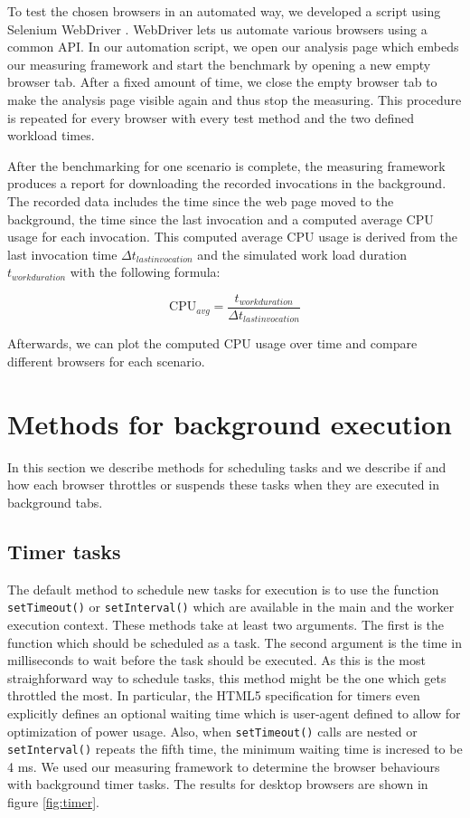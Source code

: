 \documentclass[
	ruledheaders=section,%
	class=report,%
	thesis={type=bachelor},%
	accentcolor=9c,%
	custommargins=true,%
	marginpar=false,%
	parskip=half-,%
	fontsize=11pt,%
]{tudapub}
\begin{document}
  To test the chosen browsers in an automated way, we developed a script using Selenium WebDriver \cite{webdriver}. WebDriver lets us automate various browsers using a common API. In our automation script, we open our analysis page which embeds our measuring framework and start the benchmark by opening a new empty browser tab. After a fixed amount of time, we close the empty browser tab to make the analysis page visible again and thus stop the measuring. This procedure is repeated for every browser with every test method and the two defined workload times.

  After the benchmarking for one scenario is complete, the measuring framework produces a report for downloading the recorded invocations in the background. The recorded data includes the time since the web page moved to the background, the time since the last invocation and a computed average CPU usage for each invocation. This computed average CPU usage is derived from the last invocation time $\Delta t_{last invocation}$ and the simulated work load duration $t_{work duration}$  with the following formula:

  \begin{equation*}
    \text{CPU}_{avg} = \frac{t_{work duration}}{\Delta t_{last invocation}}
  \end{equation*}

  Afterwards, we can plot the computed CPU usage over time and compare different browsers for each scenario.

  \section{Methods for background execution}
  \label{chap:methods}

  In this section we describe methods for scheduling tasks and we describe if and how each browser throttles or suspends these tasks when they are executed in background tabs.
  
  \subsection{Timer tasks}
  \label{sec:timer-tasks}

  The default method to schedule new tasks for execution is to use the function \texttt{setTimeout()} or \texttt{setInterval()} which are available in the main and the worker execution context. These methods take at least two arguments. The first is the function which should be scheduled as a task. The second argument is the time in milliseconds to wait before the task should be executed. As this is the most straighforward way to schedule tasks, this method might be the one which gets throttled the most. In particular, the HTML5 specification for timers \cite{whatwg-timers} even explicitly defines an optional waiting time which is user-agent defined to allow for optimization of power usage. Also, when \texttt{setTimeout()} calls are nested or \texttt{setInterval()} repeats the fifth time, the minimum waiting time is incresed to be 4 ms. We used our measuring framework to determine the browser behaviours with background timer tasks. The results for desktop browsers are shown in figure \ref{fig:timer}.
\end{document}
